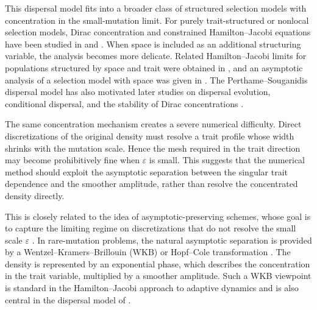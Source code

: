 \documentclass[11pt]{article}
\begin{document}
This dispersal model fits into a broader class of structured selection models with concentration in the small-mutation limit. For purely trait-structured or nonlocal selection models, Dirac concentration and constrained Hamilton--Jacobi equations have been studied in \cite{DesvillettesJabinMischlerRaoul} and \cite{LorzMirrahimiPerthame}. When space is included as an additional structuring variable, the analysis becomes more delicate. 
Related Hamilton--Jacobi limits for populations structured by space and trait were obtained in \cite{BouinMirrahimi}, and an asymptotic analysis of a selection model with space was given in \cite{MirrahimiPerthame}. 
The Perthame--Souganidis dispersal model has also motivated later studies on dispersal evolution, conditional dispersal, and the stability of Dirac concentrations \cite{HaoLamLou2019, Lam2017,LamLouPerthame2023}.



The same concentration mechanism creates a severe numerical difficulty.  Direct
discretizations of the original density must resolve a trait profile whose
width shrinks with the mutation scale.  Hence the mesh required in the trait
direction may become prohibitively fine when \(\varepsilon\) is small.  This
suggests that the numerical method should exploit the asymptotic separation
between the singular trait dependence and the smoother amplitude, rather than
resolve the concentrated density directly.

This is closely related to the idea of asymptotic-preserving schemes, whose
goal is to capture the limiting regime on discretizations that do not resolve
the small scale \(\varepsilon\) \cite{JinAP}.  In rare-mutation problems, the
natural asymptotic separation is provided by a Wentzel–Kramers–Brillouin (WKB) \cite{BenderOrszag1999WKB} or Hopf--Cole
transformation \cite{BarlesPerthame2008}.  The density is represented by an exponential phase, which
describes the concentration in the trait variable, multiplied by a smoother
amplitude.  Such a WKB viewpoint is standard in the Hamilton--Jacobi approach
to adaptive dynamics \cite{BarlesPerthame} and is also central in the
dispersal model of \cite{PerthameSouganidis}.
\end{document}
